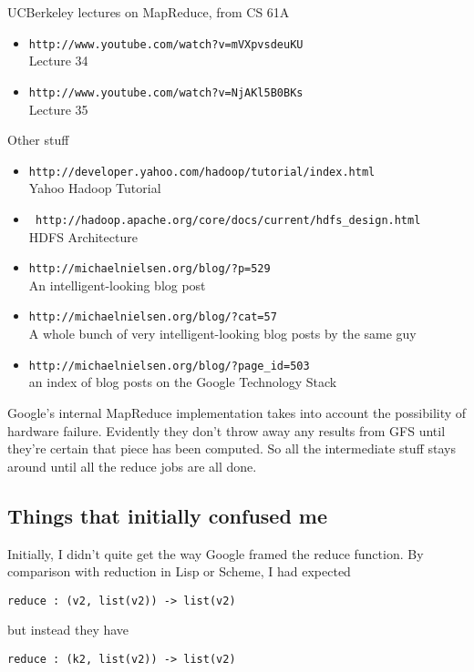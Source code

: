 \documentclass[11pt]{article}
\begin{document}
UCBerkeley lectures on MapReduce, from CS 61A
\begin{itemize}
\item {\tt http://www.youtube.com/watch?v=mVXpvsdeuKU} \\ Lecture 34
\item {\tt http://www.youtube.com/watch?v=NjAKl5B0BKs} \\ Lecture 35
\end{itemize}

Other stuff
\begin{itemize}
\item {\tt http://developer.yahoo.com/hadoop/tutorial/index.html}
  \\ Yahoo Hadoop Tutorial
\item {\tt
  http://hadoop.apache.org/core/docs/current/hdfs\_design.html}
  \\ HDFS Architecture
\item {\tt http://michaelnielsen.org/blog/?p=529} \\ An
  intelligent-looking blog post
\item {\tt http://michaelnielsen.org/blog/?cat=57} \\ A whole bunch
  of very intelligent-looking blog posts by the same guy
\item {\tt http://michaelnielsen.org/blog/?page\_id=503} \\ an index
  of blog posts on the Google Technology Stack
\end{itemize}
Google's internal MapReduce implementation takes into account the
possibility of hardware failure. Evidently they don't throw away any
results from GFS until they're certain that piece has been computed.
So all the intermediate stuff stays around until all the reduce jobs
are all done.

\subsection{Things that initially confused me}

Initially, I didn't quite get the way Google framed the reduce
function. By comparison with reduction in Lisp or Scheme, I had
expected

\begin{verbatim}
reduce : (v2, list(v2)) -> list(v2)
\end{verbatim}

but instead they have

\begin{verbatim}
reduce : (k2, list(v2)) -> list(v2)
\end{verbatim}
\end{document}

